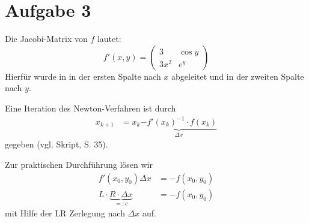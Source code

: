 \section*{Aufgabe 3}
Die Jacobi-Matrix von $f$ lautet:
\[f' (x,y) = \begin{pmatrix}
	3     & \cos y\\
	3 x^2 & e^y
\end{pmatrix}\]
Hierfür wurde in in der ersten Spalte nach $x$ abgeleitet und in der
zweiten Spalte nach $y$.

Eine Iteration des Newton-Verfahren ist durch
\begin{align}
x_{k+1}&=x_{k}\underbrace{-f'(x_k)^{-1}\cdot f(x_k)}_{\Delta x}
\end{align}
gegeben (vgl. Skript, S. 35).

Zur praktischen Durchführung lösen wir
\begin{align}
    f'(x_0, y_0)\Delta x &= -f(x_0,y_0)\\
    L \cdot \underbrace{R \cdot \Delta x}_{=: c} &= -f(x_0, y_0)
\end{align}
mit Hilfe der LR Zerlegung nach $\Delta x$ auf.

